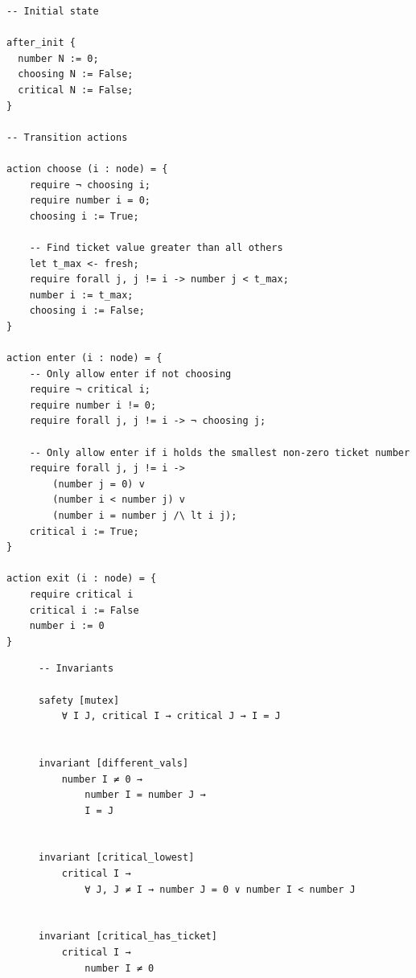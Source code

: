 \documentclass{article}
\theoremstyle{definition}
\begin{document}
\begin{lstlisting}[style=lean4style, caption={Initial state and transition actions}, label={lst:transitions}]
-- Initial state

after_init {
  number N := 0;
  choosing N := False;
  critical N := False;
}

-- Transition actions

action choose (i : node) = {
    require ¬ choosing i;
    require number i = 0;
    choosing i := True;

    -- Find ticket value greater than all others
    let t_max <- fresh;
    require forall j, j != i -> number j < t_max;
    number i := t_max;
    choosing i := False;
}

action enter (i : node) = {
    -- Only allow enter if not choosing
    require ¬ critical i;
    require number i != 0;
    require forall j, j != i -> ¬ choosing j;

    -- Only allow enter if i holds the smallest non-zero ticket number
    require forall j, j != i ->
        (number j = 0) v
        (number i < number j) v
        (number i = number j /\ lt i j);
    critical i := True;
}

action exit (i : node) = {
    require critical i
    critical i := False
    number i := 0
}

\end{lstlisting}

\begin{figure}[H]
    \begin{lstlisting}[style=lean4style, caption={System invariants}, label={lst:invariants}]
-- Invariants

safety [mutex]
    ∀ I J, critical I → critical J → I = J


invariant [different_vals]
    number I ≠ 0 →
        number I = number J →
        I = J


invariant [critical_lowest]
    critical I →
        ∀ J, J ≠ I → number J = 0 ∨ number I < number J


invariant [critical_has_ticket]
    critical I →
        number I ≠ 0
    \end{lstlisting}
\end{figure}
\end{document}
